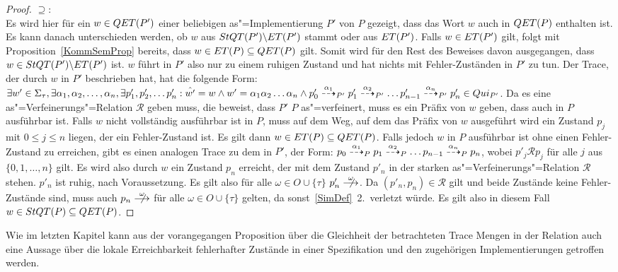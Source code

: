 \begin{proof}
  $\supseteq$:\\
  Es wird hier für ein $w\in QET (P')$ einer beliebigen as"=Implementierung
  $P'$ von $P$ gezeigt, dass das Wort $w$ auch in $QET (P)$ enthalten ist. Es
  kann danach unterschieden werden, ob $w$ aus $StQT (P')\backslash ET (P')$
  stammt oder aus $ET (P')$. Falls $w\in ET (P')$ gilt, folgt mit
  Proposition~\ref{KommSemProp} bereits, dass $w\in ET (P) \subseteq QET (P)$
  gilt. Somit wird für den Rest des Beweises davon ausgegangen, dass $w\in StQT
  (P')\backslash ET (P')$ ist. $w$ führt in $P'$ also nur zu einem ruhigen
  Zustand und hat nichts mit Fehler-Zuständen in $P'$ zu tun. Der Trace, der
  durch $w$ in $P'$ beschrieben hat, hat die folgende Form: $\exists w'\in
  \Sigma _{\tau}, \exists \alpha _1, \alpha _2, \dots , \alpha _n, \exists
  p'_1, p'_2, \dots p'_n : \hat{w'} = w \land w' = \alpha _1\alpha _2\dots
  \alpha _n \land p'_0 \may[\alpha _1]_{P'} p'_1 \may[\alpha _2]_{P'} \dots
  p'_{n-1} \may[\alpha _n]_{P'} p'_n \in Qui _{P'}$. Da es eine
  as"=Verfeinerungs"=Relation $\mathcal{R}$ geben muss, die beweist, dass $P'$
  $P$ as"=verfeinert, muss es ein Präfix von $w$ geben, dass auch in $P$
  ausführbar ist. Falls $w$ nicht vollständig ausführbar ist in $P$, muss auf
  dem Weg, auf dem das Präfix von $w$ ausgeführt wird ein Zustand $p_j$ mit $0
  \leq j \leq n$ liegen, der ein Fehler-Zustand ist. Es gilt dann $w\in ET
  (P)\subseteq QET (P)$. Falls jedoch $w$ in $P$ ausführbar ist ohne einen
  Fehler-Zustand zu erreichen, gibt es einen analogen Trace zu dem in $P'$, der
  Form: $p_0 \may[\alpha _1]_P p_1 \may[\alpha _2]_P \dots p_{n-1} \may[\alpha
  _n]_P p_n$, wobei $p'_j \mathcal{R} p_j$ für alle $j$ aus $\{0,1,\dots ,n\}$
  gilt. Es wird also durch $w$ ein Zustand $p_n$ erreicht, der mit dem Zustand
  $p'_n$ in der starken as"=Verfeinerungs"=Relation $\mathcal{R}$ stehen.
  $p'_n$ ist ruhig, nach Voraussetzung. Es gilt also für alle $\omega\in O\cup
  \{\tau\}$ $p'_n\nmust[\omega]$. Da $(p'_n,p_n) \in\mathcal{R}$ gilt und beide
  Zustände keine Fehler-Zustände sind, muss auch $p_n\nmust[\omega]$ für alle
  $\omega\in O\cup \{\tau\}$ gelten, da sonst~\ref{SimDef}~2.\ verletzt würde.
  Es gilt also in diesem Fall $w\in StQT (P)\subseteq QET (P)$.
\end{proof}

Wie im letzten Kapitel kann aus der vorangegangen Proposition über die
Gleichheit der betrachteten Trace Mengen in der Relation \QRel{} auch eine
Aussage über die lokale Erreichbarkeit \glqq fehlerhafter Zustände\grqq{} in
einer Spezifikation und den zugehörigen Implementierungen getroffen werden.

